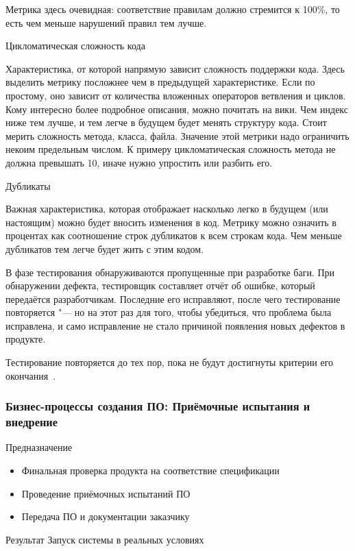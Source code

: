 \documentclass{../industrial-development}
\begin{document}
Метрика здесь очевидная: соответствие правилам должно стремится к 100\%, то есть чем меньше нарушений правил тем лучше.

Цикломатическая сложность кода

Характеристика, от которой напрямую зависит сложность поддержки кода. Здесь выделить метрику посложнее чем в предыдущей характеристике. Если по простому, оно зависит от количества вложенных операторов ветвления и циклов. Кому интересно более подробное описания, можно почитать на вики. Чем индекс ниже тем лучше, и тем легче в будущем будет менять структуру кода. Стоит мерить сложность метода, класса, файла. Значение этой метрики надо ограничить некоим предельным числом. К примеру цикломатическая сложность метода не должна превышать 10, иначе нужно упростить или разбить его.

Дубликаты

Важная характеристика, которая отображает насколько легко в будущем (или настоящим) можно будет вносить изменения в код. Метрику можно означить в процентах как соотношение строк дубликатов к всем строкам кода. Чем меньше дубликатов тем легче будет жить с этим кодом.

В фазе тестирования обнаруживаются пропущенные при разработке баги. При обнаружении дефекта, тестировщик составляет отчёт об ошибке, который передаётся разработчикам. Последние его исправляют, после чего тестирование повторяется "--- но на этот раз для того, чтобы убедиться, что проблема была исправлена, и само исправление не стало причиной появления новых дефектов в продукте.

Тестирование повторяется до тех пор, пока не будут достигнуты критерии его окончания~\cite{Habr2}.


\begin{frame} \frametitle{Бизнес-процессы создания ПО: Приёмочные испытания и внедрение}
	\begin{block}{Предназначение}
		\begin{itemize}
			\item Финальная проверка продукта на соответствие спецификации
			\item Проведение приёмочных испытаний ПО
			\item Передача ПО и документации заказчику
		\end{itemize}
	\end{block}
	\begin{block}{Результат}
		Запуск системы в реальных условиях
	\end{block}
\end{frame}
\end{document}
